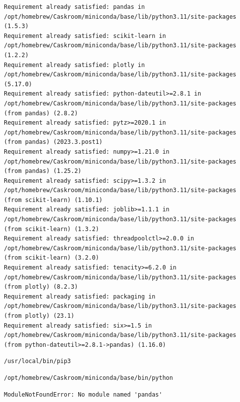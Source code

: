 \documentclass[
  letterpaper,
  DIV=11,
  numbers=noendperiod]{scrartcl}
\begin{document}
\begin{verbatim}
Requirement already satisfied: pandas in /opt/homebrew/Caskroom/miniconda/base/lib/python3.11/site-packages (1.5.3)
Requirement already satisfied: scikit-learn in /opt/homebrew/Caskroom/miniconda/base/lib/python3.11/site-packages (1.2.2)
Requirement already satisfied: plotly in /opt/homebrew/Caskroom/miniconda/base/lib/python3.11/site-packages (5.17.0)
Requirement already satisfied: python-dateutil>=2.8.1 in /opt/homebrew/Caskroom/miniconda/base/lib/python3.11/site-packages (from pandas) (2.8.2)
Requirement already satisfied: pytz>=2020.1 in /opt/homebrew/Caskroom/miniconda/base/lib/python3.11/site-packages (from pandas) (2023.3.post1)
Requirement already satisfied: numpy>=1.21.0 in /opt/homebrew/Caskroom/miniconda/base/lib/python3.11/site-packages (from pandas) (1.25.2)
Requirement already satisfied: scipy>=1.3.2 in /opt/homebrew/Caskroom/miniconda/base/lib/python3.11/site-packages (from scikit-learn) (1.10.1)
Requirement already satisfied: joblib>=1.1.1 in /opt/homebrew/Caskroom/miniconda/base/lib/python3.11/site-packages (from scikit-learn) (1.3.2)
Requirement already satisfied: threadpoolctl>=2.0.0 in /opt/homebrew/Caskroom/miniconda/base/lib/python3.11/site-packages (from scikit-learn) (3.2.0)
Requirement already satisfied: tenacity>=6.2.0 in /opt/homebrew/Caskroom/miniconda/base/lib/python3.11/site-packages (from plotly) (8.2.3)
Requirement already satisfied: packaging in /opt/homebrew/Caskroom/miniconda/base/lib/python3.11/site-packages (from plotly) (23.1)
Requirement already satisfied: six>=1.5 in /opt/homebrew/Caskroom/miniconda/base/lib/python3.11/site-packages (from python-dateutil>=2.8.1->pandas) (1.16.0)
\end{verbatim}

\begin{verbatim}
/usr/local/bin/pip3
\end{verbatim}

\begin{verbatim}
/opt/homebrew/Caskroom/miniconda/base/bin/python
\end{verbatim}

\begin{verbatim}
ModuleNotFoundError: No module named 'pandas'
\end{verbatim}
\end{document}
